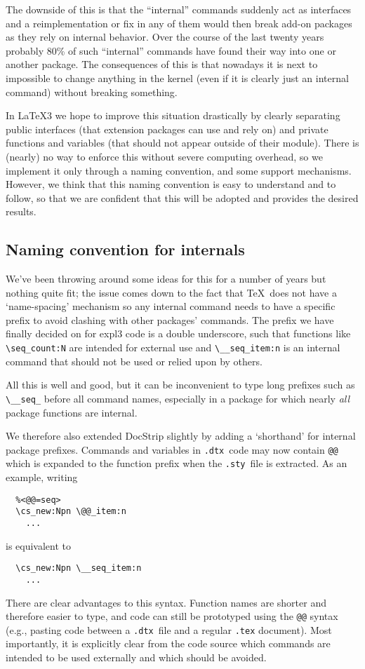 \documentclass{ltnews}
\def\DTX{\texttt{.dtx}}
\def\STY{\texttt{.sty}}
\begin{document}
The downside of this is that the ``internal'' commands suddenly act as
interfaces and a reimplementation or fix in any of them would then
break add-on packages as they rely on internal behavior. Over the
course of the last twenty years probably 80\% of such ``internal''
commands have found their way into one or another package.  The
consequences of this is that nowadays it is next to impossible to
change anything in the \LaTeXe{} kernel (even if it is clearly just an
internal command) without breaking something.
 

In \LaTeX3 we hope to improve this situation drastically by
clearly separating public interfaces (that extension packages can use
and rely on) and private functions and variables (that should not
appear outside of their module).  There is (nearly) no way to enforce
this without severe computing overhead, so we implement it only
through a naming convention, and some support mechanisms.  However, we
think that this naming convention is easy to understand and to follow,
so that we are confident that this will be adopted and provides the
desired results.

\subsection{Naming convention for internals}

We've been throwing around some ideas for this for a number of years but nothing quite fit; the issue comes down to the fact that \TeX\ does not have a `name-spacing' mechanism so any internal command needs to have a specific prefix to avoid clashing with other packages' commands.
The prefix we have finally decided on for \textsf{expl3} code is a double underscore, such that functions like \verb|\seq_count:N| are intended for external use and \verb|\__seq_item:n| is an internal command that should not be used or relied upon by others.

All this is well and good, but it can be inconvenient to type long prefixes such as \verb|\__seq_| before all command names, especially in a package for which nearly \emph{all} package functions are internal.

We therefore also extended \textsf{DocStrip} slightly by adding  a `shorthand' for internal package prefixes.
Commands and variables in \DTX\ code may now contain \texttt{@@} which is expanded to the function prefix when the \STY\ file is extracted.
As an example, writing
\begin{verbatim}
  %<@@=seq>
  \cs_new:Npn \@@_item:n
    ...
\end{verbatim}
is equivalent to
\begin{verbatim}
  \cs_new:Npn \__seq_item:n
    ...
\end{verbatim}
There are clear advantages to this syntax.
Function names are shorter and therefore easier to type, and code can still be prototyped using the \texttt{@@} syntax
(e.g., pasting code between a \DTX\ file and a regular \texttt{.tex} document).
Most importantly, it is explicitly clear from the code source which commands are intended to be used externally and which should be avoided.
\end{document}
